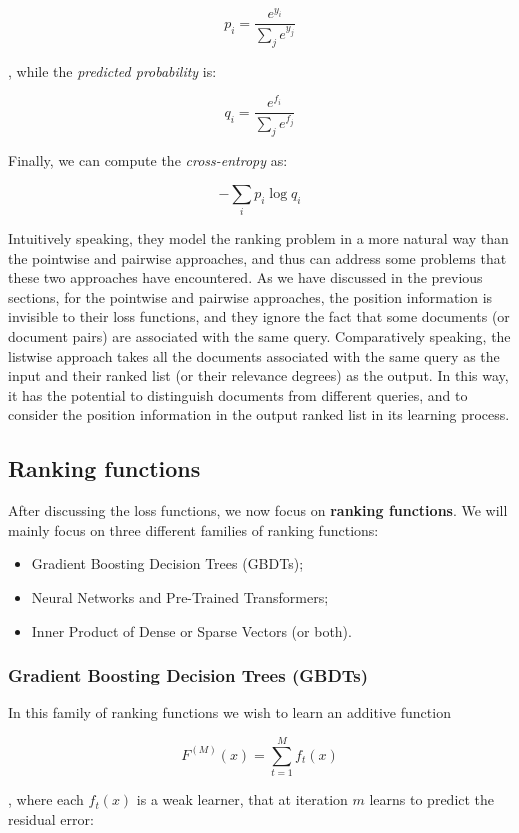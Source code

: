 $$
p_i = \frac{e^{y_i}}{\sum_j e^{y_j}}
$$

, while the \textit{predicted probability} is:

$$
q_i = \frac{e^{f_i}}{\sum_j e^{f_j}}
$$

Finally, we can compute the \textit{cross-entropy} as:

$$
-\sum_i p_i \log q_i
$$

Intuitively speaking, they model the ranking problem in a more natural way than the pointwise and pairwise approaches, and thus can address some problems that these two approaches have encountered. As we have discussed in the previous sections, for the pointwise and pairwise approaches, the position information is invisible to their loss functions, and they ignore the fact that some documents (or document pairs) are associated with the same query. Comparatively speaking, the listwise approach takes all the documents associated with the same query as the input and their ranked list (or their relevance degrees) as the output. In this way, it has the potential to distinguish documents from different queries, and to consider the position information in the output ranked list in its learning process.

\subsection{Ranking functions}
After discussing the loss functions, we now focus on \textbf{ranking functions}. We will mainly focus on three different families of ranking functions:

\begin{itemize}
    \item Gradient Boosting Decision Trees (GBDTs);
    \item Neural Networks and Pre-Trained Transformers;
    \item Inner Product of Dense or Sparse Vectors (or both).
\end{itemize}

\subsubsection{Gradient Boosting Decision Trees (GBDTs)}
In this family of ranking functions we wish to learn an additive function

$$
F^{(M)}(x) = \sum_{t = 1}^M f_t(x)
$$

, where each $f_t(x)$ is a weak learner, that at iteration $m$ learns to predict the residual error:

